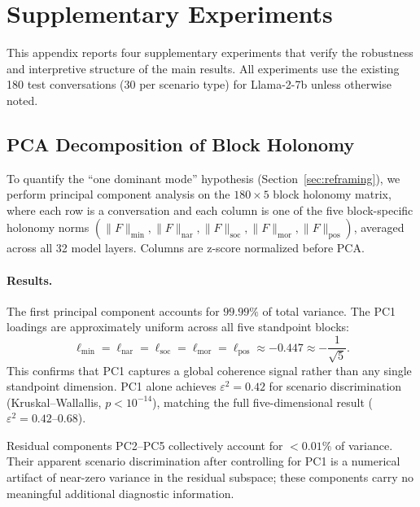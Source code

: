 
\section{Supplementary Experiments}
\label{app:supplementary}

This appendix reports four supplementary experiments that verify the robustness
and interpretive structure of the main results. All experiments use the existing
180 test conversations (30 per scenario type) for Llama-2-7b unless otherwise noted.

\subsection{PCA Decomposition of Block Holonomy}
\label{app:pca}

To quantify the ``one dominant mode'' hypothesis (Section~\ref{sec:reframing}), we
perform principal component analysis on the $180 \times 5$ block holonomy matrix,
where each row is a conversation and each column is one of the five block-specific
holonomy norms $(\|F\|_{\min}, \|F\|_{\mathrm{nar}}, \|F\|_{\mathrm{soc}},
\|F\|_{\mathrm{mor}}, \|F\|_{\mathrm{pos}})$, averaged across all 32 model layers.
Columns are z-score normalized before PCA.

\paragraph{Results.}
The first principal component accounts for $99.99\%$ of total variance. The PC1
loadings are approximately uniform across all five standpoint blocks:
\begin{equation}
    \ell_{\min} = \ell_{\mathrm{nar}} = \ell_{\mathrm{soc}} = \ell_{\mathrm{mor}} =
    \ell_{\mathrm{pos}} \approx -0.447 \approx -\frac{1}{\sqrt{5}}.
\end{equation}
This confirms that PC1 captures a global coherence signal rather than any single
standpoint dimension. PC1 alone achieves $\varepsilon^2 = 0.42$ for scenario
discrimination (Kruskal--Wallallis, $p < 10^{-14}$), matching the full
five-dimensional result ($\varepsilon^2 = 0.42$--$0.68$).

Residual components PC2--PC5 collectively account for $< 0.01\%$ of variance.
Their apparent scenario discrimination after controlling for PC1 is a numerical
artifact of near-zero variance in the residual subspace; these components carry
no meaningful additional diagnostic information.

